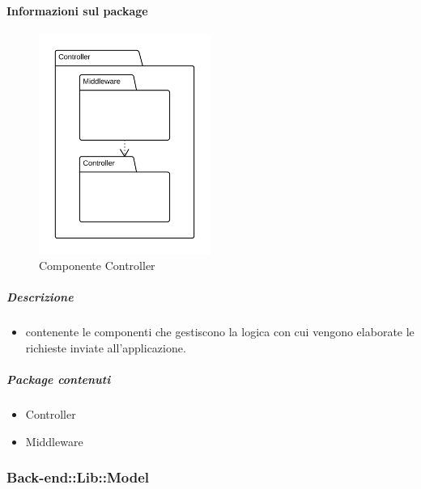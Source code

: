 	\paragraph{Informazioni sul package} 
		\begin{figure}[H] 
			\begin{center} 
				\centering
				\includegraphics[width=0.5\textwidth]{uml/package/Back-end::Lib::Controller.png}  
				\caption{Componente Controller}
			\end{center}  
		\end{figure} 
	\subparagraph{Descrizione} 
		\begin{itemize}
		\item[]  contenente le componenti che gestiscono la logica con cui vengono elaborate le richieste inviate all’applicazione.
		\end{itemize} 
		\subparagraph{Package contenuti} 
		\begin{itemize}
				\item Controller
				\item Middleware
		\end{itemize}
	\subsubsection{Back-end::Lib::Model}

